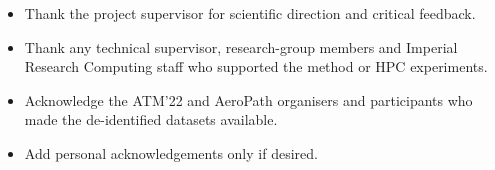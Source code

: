 \documentclass[
11pt, %
oneside, %
english, %
singlespacing, %
parskip, %
headsepline, %
]{MastersDoctoralThesis} %
\begin{document}

\begin{acknowledgements}
\addchaptertocentry{\acknowledgementname} %
\begin{itemize}
  \item Thank the project supervisor for scientific direction and critical feedback.
  \item Thank any technical supervisor, research-group members and Imperial Research
  Computing staff who supported the method or HPC experiments.
  \item Acknowledge the ATM'22 and AeroPath organisers and participants who made the
  de-identified datasets available.
  \item Add personal acknowledgements only if desired.
\end{itemize}
\end{acknowledgements}


\tableofcontents %

\listoffigures %

\listoftables %


\mainmatter %

\pagestyle{thesis} %

\end{document}
